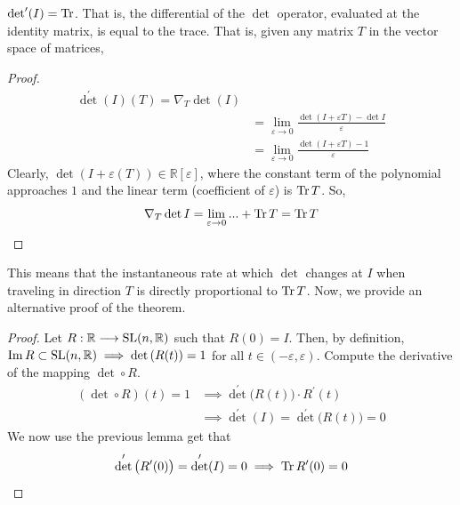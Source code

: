   \begin{lemma}
    $\det^\prime (I) = \operatorname{Tr}$. That is, the differential of the $\det$ operator, evaluated at the identity matrix, is equal to the trace. That is, given any matrix $T$ in the vector space of matrices, 
  \end{lemma}
  \begin{proof}
    \begin{align*}
      \det^\prime (I) (T) = \nabla_T \det(I) \\
      & = \lim_{\varepsilon \rightarrow 0} \frac{\det{(I + \varepsilon T)} - \det{I}}{\varepsilon} \\
      & = \lim_{\varepsilon \rightarrow 0} \frac{\det{(I + \varepsilon T)} - 1}{\varepsilon}
    \end{align*}
    Clearly, $\det(I + \varepsilon(T)) \in \mathbb{R}[\varepsilon]$, where the constant term of the polynomial approaches $1$ and the linear term (coefficient of $\varepsilon$) is $\operatorname{Tr}{T}$. So, 
    \begin{equation}
      \nabla_T \det{I} = \lim_{\varepsilon \rightarrow 0} ... + \operatorname{Tr}{T} = \operatorname{Tr}{T}
    \end{equation}
  \end{proof}

  This means that the instantaneous rate at which $\det$ changes at $I$ when traveling in direction $T$ is directly proportional to $\operatorname{Tr}{T}$. Now, we provide an alternative proof of the theorem. 
  \begin{proof}
    Let $R: \mathbb{R} \longrightarrow \operatorname{SL}(n, \mathbb{R})$ such that $R(0) = I$. Then, by definition, $\operatorname{Im}{R} \subset \operatorname{SL}(n, \mathbb{R}) \implies \det{(R(t))} = 1$ for all $t \in (-\varepsilon, \varepsilon)$. Compute the derivative of the mapping $\det \circ R$. 
    \begin{align*}
        (\det \circ  R) (t) = 1 & \implies \det^\prime \big( R(t) \big) \cdot R^\prime (t) \\ 
        & \implies \det^\prime (I) = \det^\prime \big(R(t)\big) = 0 
    \end{align*}
    We now use the previous lemma get that 
    \begin{equation}
      \det^\prime \big( R^\prime(0)\big) = \det^\prime (I)=0 \implies \operatorname{Tr}{R^\prime(0)} = 0
    \end{equation}
  \end{proof} 

